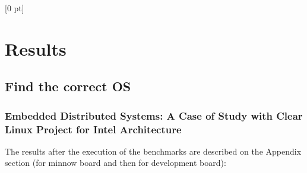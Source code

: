 \titlespacing{\chapter}{0 pt}{30 pt}{50 pt}[0 pt]
\titleformat{\section}{\Large\bfseries}{\thesection}{0 pt}{\hspace{30 pt}}
\titleformat{\subsection}{\large\bfseries}{\thesubsection}{0 pt}{\hspace{30 pt}}
\pagestyle{fancy}
\fancyhead[LO,LE]{\footnotesize\emph{\leftmark}}
\fancyhead[RO,RE]{\thepage}
\fancyfoot[CO,CE]{}

\chapter{Results}

\normalsize
\noindent

\section{Find the correct OS}
\noindent

    \subsection {Embedded Distributed Systems: A Case of Study with Clear Linux
    Project for Intel Architecture}
    \noindent

The results after the execution of the benchmarks are described on the Appendix
section (for minnow board and then for development board):

